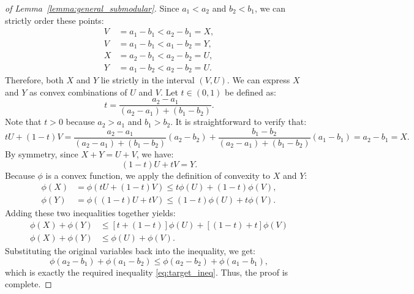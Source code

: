 \documentclass[11pt]{article}
\theoremstyle{plain}
\theoremstyle{definition}
\theoremstyle{remark}
\begin{document}
\begin{appendix}
\begin{proof}[of Lemma~\ref{lemma:general_submodular}]
Since $a_1 < a_2$ and $b_2 < b_1$, we can strictly order these points:
\begin{align*}
    V &= a_1 - b_1 < a_2 - b_1 = X, \\
    V &= a_1 - b_1 < a_1 - b_2 = Y, \\
    X &= a_2 - b_1 < a_2 - b_2 = U, \\
    Y &= a_1 - b_2 < a_2 - b_2 = U.
\end{align*}
Therefore, both $X$ and $Y$ lie strictly in the interval $(V, U)$. We can express $X$ and $Y$ as convex combinations of $U$ and $V$. Let $t \in (0, 1)$ be defined as:
\begin{equation*}
    t = \frac{a_2 - a_1}{(a_2 - a_1) + (b_1 - b_2)}.
\end{equation*}
Note that $t > 0$ because $a_2 > a_1$ and $b_1 > b_2$. It is straightforward to verify that:
\begin{equation*}
    t U + (1-t) V = \frac{a_2 - a_1}{(a_2 - a_1) + (b_1 - b_2)}(a_2 - b_2) + \frac{b_1 - b_2}{(a_2 - a_1) + (b_1 - b_2)}(a_1 - b_1) = a_2 - b_1 = X.
\end{equation*}
By symmetry, since $X + Y = U + V$, we have:
\begin{equation*}
    (1-t) U + t V = Y.
\end{equation*}
Because $\phi$ is a convex function, we apply the definition of convexity to $X$ and $Y$:
\begin{align*}
    \phi(X) &= \phi(t U + (1-t) V) \leq t \phi(U) + (1-t) \phi(V), \\
    \phi(Y) &= \phi((1-t) U + t V) \leq (1-t) \phi(U) + t \phi(V).
\end{align*}
Adding these two inequalities together yields:
\begin{align*}
    \phi(X) + \phi(Y) &\leq [t + (1-t)] \phi(U) + [(1-t) + t] \phi(V) \\
    \phi(X) + \phi(Y) &\leq \phi(U) + \phi(V).
\end{align*}
Substituting the original variables back into the inequality, we get:
\begin{equation*}
    \phi(a_2 - b_1) + \phi(a_1 - b_2) \leq \phi(a_2 - b_2) + \phi(a_1 - b_1),
\end{equation*}
which is exactly the required inequality \eqref{eq:target_ineq}. Thus, the proof is complete.
\end{proof}

\end{appendix}
\end{document}
